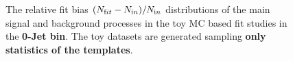 \begin{figure}[!hbtp]
{} 

\caption{The relative fit bias $(N_{\text fit} - N_{\text in})/N_{\text in}$ distributions 
of the main signal and background processes in the toy MC based fit studies in the {\bf 0-Jet bin}. 
The toy datasets are generated sampling {\bf only statistics of the templates}. }
\label{fig:toyfit_statonly_0j}
\end{figure}


